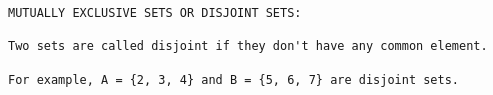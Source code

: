 \documentclass[a4paper,12pt]{article}
\begin{document}
\newpage
\begin{verbatim}
MUTUALLY EXCLUSIVE SETS OR DISJOINT SETS: 

Two sets are called disjoint if they don't have any common element. 

For example, A = {2, 3, 4} and B = {5, 6, 7} are disjoint sets.

\end{verbatim}
\end{document}
